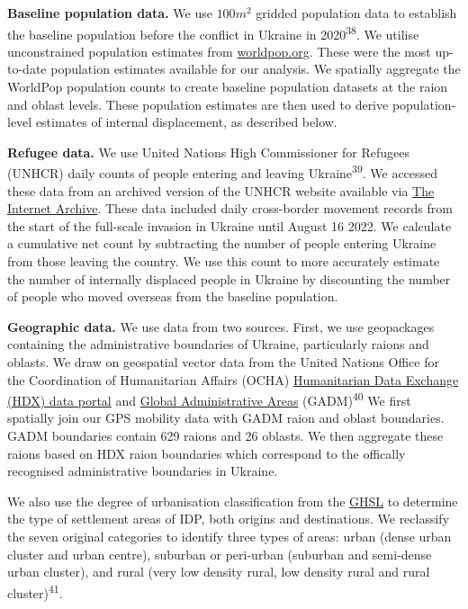 \documentclass[
  11pt,
]{article}
\begin{document}
\textbf{Baseline population data.} We use \(100m^{2}\) gridded
population data to establish the baseline population before the conflict
in Ukraine in 2020\textsuperscript{38}. We utilise unconstrained
population estimates from
\href{https://www.worldpop.org/}{worldpop.org}. These were the most
up-to-date population estimates available for our analysis. We spatially
aggregate the WorldPop population counts to create baseline population
datasets at the raion and oblast levels. These population estimates are
then used to derive population-level estimates of internal displacement,
as described below.

\textbf{Refugee data.} We use United Nations High Commissioner for
Refugees (UNHCR) daily counts of people entering and leaving
Ukraine\textsuperscript{39}. We accessed these data from an archived
version of the UNHCR website available via
\href{https://web.archive.org/}{The Internet Archive}. These data
included daily cross-border movement records from the start of the
full-scale invasion in Ukraine until August 16 2022. We calculate a
cumulative net count by subtracting the number of people entering
Ukraine from those leaving the country. We use this count to more
accurately estimate the number of internally displaced people in Ukraine
by discounting the number of people who moved overseas from the baseline
population.

\textbf{Geographic data.} We use data from two sources. First, we use
geopackages containing the administrative boundaries of Ukraine,
particularly raions and oblasts. We draw on geospatial vector data from
the United Nations Office for the Coordination of Humanitarian Affairs
(OCHA) \href{https://data.humdata.org/dataset?}{Humanitarian Data
Exchange (HDX) data portal} and \href{https://gadm.org/}{Global
Administrative Areas} (GADM)\textsuperscript{40} We first spatially join
our GPS mobility data with GADM raion and oblast boundaries. GADM
boundaries contain 629 raions and 26 oblasts. We then aggregate these
raions based on HDX raion boundaries which correspond to the offically
recognised administrative boundaries in Ukraine.

We also use the degree of urbanisation classification from the
\href{https://human-settlement.emergency.copernicus.eu/}{GHSL} to
determine the type of settlement areas of IDP, both origins and
destinations. We reclassify the seven original categories to identify
three types of areas: urban (dense urban cluster and urban centre),
suburban or peri-urban (suburban and semi-dense urban cluster), and
rural (very low density rural, low density rural and rural
cluster)\textsuperscript{41}.
\end{document}
